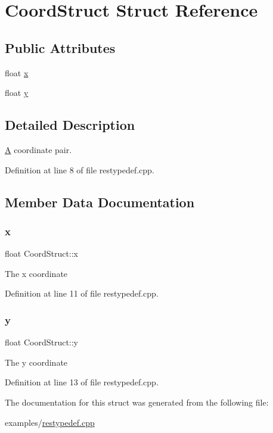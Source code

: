 \hypertarget{struct_coord_struct}{}\section{Coord\+Struct Struct Reference}
\label{struct_coord_struct}
\subsection*{Public Attributes}
\begin{DoxyCompactItemize}
\item 
float \mbox{\hyperlink{struct_coord_struct_a183d7226fc5a8470ce9b9f04f9cb69bb}{x}}
\item 
float \mbox{\hyperlink{struct_coord_struct_a1a5966a881bc3e76e9becf00639585ac}{y}}
\end{DoxyCompactItemize}


\subsection{Detailed Description}
\mbox{\hyperlink{class_a}{A}} coordinate pair. 

Definition at line 8 of file restypedef.\+cpp.



\subsection{Member Data Documentation}
\mbox{\label{struct_coord_struct_a183d7226fc5a8470ce9b9f04f9cb69bb}} 
\subsubsection{\texorpdfstring{x}{x}}
{\footnotesize\ttfamily float Coord\+Struct\+::x}

The x coordinate 

Definition at line 11 of file restypedef.\+cpp.

\mbox{\label{struct_coord_struct_a1a5966a881bc3e76e9becf00639585ac}} 
\subsubsection{\texorpdfstring{y}{y}}
{\footnotesize\ttfamily float Coord\+Struct\+::y}

The y coordinate 

Definition at line 13 of file restypedef.\+cpp.



The documentation for this struct was generated from the following file\+:\begin{DoxyCompactItemize}
\item 
examples/\mbox{\hyperlink{restypedef_8cpp}{restypedef.\+cpp}}\end{DoxyCompactItemize}

